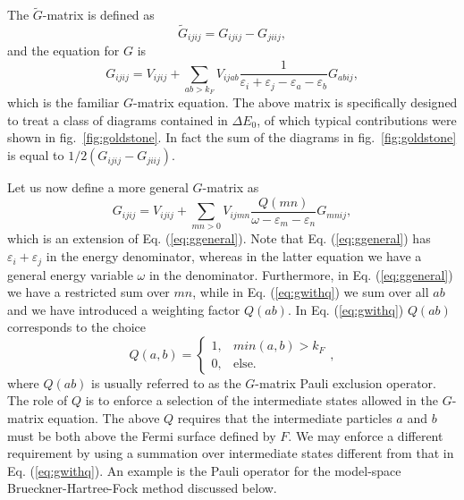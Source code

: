 The $\tilde{G}$-matrix  is defined as
\begin{equation}
    \tilde{G}_{ijij}=G_{ijij}-G_{jiij},
\end{equation}
and the equation for $G$ is
\begin{equation}
      G_{ijij}=V_{ijij}
      +\sum_{ab>k_F}V_{ijab}\frac{1}
      {\varepsilon_i+\varepsilon_j-\varepsilon_a-\varepsilon_b}
      G_{abij},
      \label{eq:ggeneral}
\end{equation}
which is the familiar $G$-matrix equation. The above
matrix is specifically designed to treat a class of diagrams
contained in $\Delta E_0$, of which typical contributions
were shown in fig.~\ref{fig:goldstone}. In fact the sum of the diagrams
in fig.~\ref{fig:goldstone} is equal to $1/2(G_{ijij}-G_{jiij})$.

Let us now define a more general $G$-matrix as
\begin{equation}
      G_{ijij}=V_{ijij}
      +\sum_{mn>0}V_{ijmn}\frac{Q(mn)}
      {\omega -\varepsilon_m-\varepsilon_n}
      G_{mnij},
      \label{eq:gwithq}
\end{equation}
which is an extension of Eq. (\ref{eq:ggeneral}). Note that 
Eq. (\ref{eq:ggeneral}) has
$\varepsilon_i+\varepsilon_j$ in the energy denominator, whereas
in the latter equation we have a general energy variable $\omega$
in the denominator. Furthermore, in Eq. (\ref{eq:ggeneral})
we have a restricted
sum over $mn$, while in Eq. (\ref{eq:gwithq})
we sum over all $ab$ and we have
introduced a weighting factor $Q(ab)$. In Eq. (\ref{eq:gwithq}) $Q(ab)$
corresponds to the choice
\begin{equation}
   Q(a , b ) =
    \left\{\begin{array}{cc}1,&min(a ,b ) > k_F\\
    0,&\mathrm{else}.\end{array}\right. ,
\end{equation}
where $Q(ab)$ is usually referred to as the $G$-matrix Pauli
exclusion operator. The role of $Q$ is to enforce a selection
of the intermediate states allowed in the $G$-matrix equation. The above
$Q$ requires that the intermediate particles $a$ and $b$
must be both above the Fermi surface defined by $F$. We may enforce
a different requirement by using a summation over intermediate states
different from that in Eq. (\ref{eq:gwithq}).
An example is the Pauli operator
for the model-space Brueckner-Hartree-Fock method discussed below.


